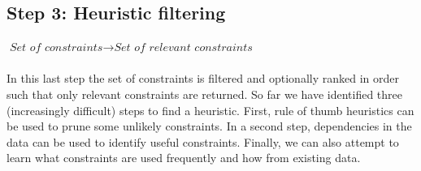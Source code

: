 \documentclass[a4paper]{article}
\begin{document}
\subsection*{Step 3: Heuristic filtering}
$\textit{Set of constraints} \rightarrow \textit{Set of relevant constraints}$\\\\
In this last step the set of constraints is filtered and optionally ranked in order such that only relevant constraints are returned.
So far we have identified three (increasingly difficult) steps to find a heuristic.
First, rule of thumb heuristics can be used to prune some unlikely constraints.
In a second step, dependencies in the data can be used to identify useful constraints.
Finally, we can also attempt to learn what constraints are used frequently and how from existing data.
\end{document}
